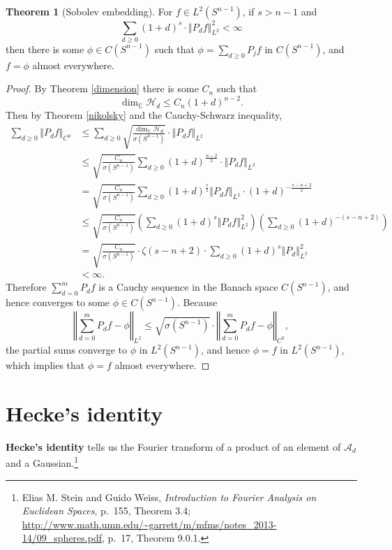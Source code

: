 \documentclass{article}
\newcommand{\norm}[1]{\left\Vert #1 \right\Vert}
\theoremstyle{definition}
\newtheorem{theorem}{Theorem}
\theoremstyle{definition}
\begin{document}
\begin{theorem}[Sobolev embedding]
For $f \in L^2(S^{n-1})$, if $s>n-1$ and
\[
\sum_{d \geq 0} (1+d)^s \cdot \norm{P_d f}_{L^2}^2 < \infty
\]
then there is some $\phi \in C(S^{n-1})$ such that  $\phi=\sum_{d \geq 0} P_j f$ in $C(S^{n-1})$, and
$f=\phi$ almost everywhere.
\end{theorem}
\begin{proof}
By Theorem \ref{dimension} there is some $C_n$ such that
\[
\dim_\mathbb{C} \mathscr{H}_d \leq C_n (1+d)^{n-2}.
\]
Then
by Theorem \ref{nikolsky} and the Cauchy-Schwarz inequality,
\begin{align*}
\sum_{d \geq 0} \norm{P_d f}_{C^0}&\leq \sum_{d \geq 0} \sqrt{\frac{\dim_{\mathbb{C}} \mathscr{H}_d}{\sigma(S^{n-1})}} \cdot \norm{P_d f}_{L^2}\\
&\leq \sqrt{\frac{C_n}{\sigma(S^{n-1})}}
\sum_{d \geq 0}  (1+d)^{\frac{n-2}{2}} \cdot \norm{P_d f}_{L^2}\\
&= \sqrt{\frac{C_n}{\sigma(S^{n-1})}}
\sum_{d \geq 0} (1+d)^{\frac{s}{2}} \norm{P_d f}_{L^2} \cdot (1+d)^{-\frac{s-n+2}{2}}\\
&\leq  \sqrt{\frac{C_n}{\sigma(S^{n-1})}} \left(\sum_{d \geq 0} (1+d)^s \norm{P_d f}_{L^2}^2 \right) \left(
\sum_{d \geq 0} (1+d)^{-(s-n+2)}\right)\\
&=   \sqrt{\frac{C_n}{\sigma(S^{n-1})}}  \cdot \zeta(s-n+2) \cdot \sum_{d \geq 0} (1+d)^s \norm{P_d}_{L^2}^2\\
&<\infty.
\end{align*}
Therefore  $\sum_{d=0}^m P_d f$ is a Cauchy sequence in the Banach space $C(S^{n-1})$, 
and hence converges to some $\phi \in C(S^{n-1})$. Because 
\[
\norm{\sum_{d=0}^m P_d f - \phi}_{L^2} \leq 
\sqrt{\sigma(S^{n-1})} \cdot \norm{\sum_{d=0}^m P_d f -\phi}_{C^0},
\]
the partial sums converge to $\phi$ in $L^2(S^{n-1})$, and hence $\phi = f$ in $L^2(S^{n-1})$, which implies that
$\phi=f$ almost everywhere.
\end{proof}




\section{Hecke's identity}
\textbf{Hecke's identity} 
tells us the Fourier transform of a product of an element of
$\mathscr{A}_d$ and a Gaussian.\footnote{Elias M. Stein and Guido Weiss, {\em Introduction to Fourier Analysis on Euclidean Spaces},
p.~155, Theorem 3.4; 
\url{http://www.math.umn.edu/~garrett/m/mfms/notes_2013-14/09_spheres.pdf}, p.~17, Theorem 9.0.1.}
\end{document}
